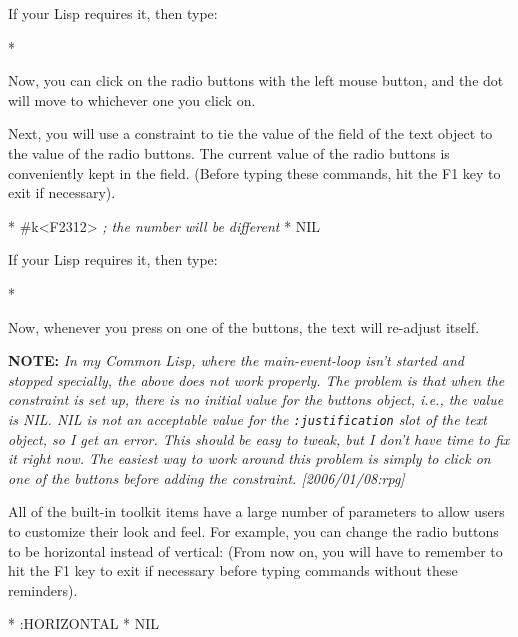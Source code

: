 If your Lisp requires it, then type:
\begin{programexample}
* 
\end{programexample}

Now, you can click on the radio buttons with the left mouse button, and the
dot will move to whichever one you click on.

Next, you will use a constraint to tie the value of the 
field of the text object to the value of the radio buttons.  The current
value of the radio buttons is conveniently kept in the  field.
(Before typing these commands, hit the F1 key to exit  
if necessary).

\begin{programexample}
* 
\#k<F2312>   {\it ; the number will be different}
* 
NIL
\end{programexample}
If your Lisp requires it, then type:
\begin{programexample}
* 
\end{programexample}

Now, whenever you press on one of the buttons, the text will re-adjust
itself.

\textbf{NOTE:}
\textit{In my Common Lisp, where the main-event-loop isn't started and
stopped specially, the above does not work properly.  The problem is
that when the constraint is set up, there is no initial value for the
buttons object, i.e., the value is NIL.  NIL is not an acceptable
value for the \texttt{:justification} slot of the text object, so I
get an error.  This should be easy to tweak, but I don't have time to
fix it right now.  The easiest way to work around this problem is
simply to click on one of the buttons before adding the constraint. [2006/01/08:rpg]}

All of the built-in toolkit items have a large number of parameters to
allow users to customize their look and feel.  For example, you can change
the radio buttons to be horizontal instead of vertical:
(From now on, you will have to remember to hit the F1 key to exit
 if necessary before typing commands without these
reminders).
\begin{programexample}
* 
:HORIZONTAL
* 
NIL
\end{programexample}

